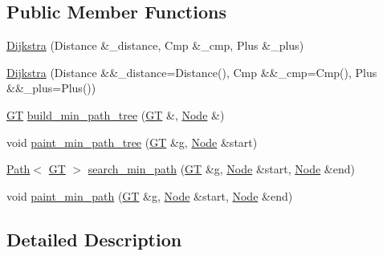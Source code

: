 \subsection*{Public Member Functions}
\begin{DoxyCompactItemize}
\item 
\hyperlink{class_designar_1_1_dijkstra_ada4a9a8403304341114425e296c5ed26}{Dijkstra} (Distance \&\+\_\+distance, Cmp \&\+\_\+cmp, Plus \&\+\_\+plus)
\item 
\hyperlink{class_designar_1_1_dijkstra_a26f374b129c8108d6b95fc57f8dc09df}{Dijkstra} (Distance \&\&\+\_\+distance=Distance(), Cmp \&\&\+\_\+cmp=Cmp(), Plus \&\&\+\_\+plus=Plus())
\item 
\hyperlink{demo-buildgraph_8_c_a3001c40d2c31ca87ed96cd7d1334a55e}{GT} \hyperlink{class_designar_1_1_dijkstra_a70bbeb5dcd70c6ff3d203b7772021467}{build\+\_\+min\+\_\+path\+\_\+tree} (\hyperlink{demo-buildgraph_8_c_a3001c40d2c31ca87ed96cd7d1334a55e}{GT} \&, \hyperlink{class_designar_1_1_dijkstra_afeb644fc5395569ec366f0d220ab477d}{Node} \&)
\item 
void \hyperlink{class_designar_1_1_dijkstra_a607872c03f2e6de59936118e6f6c8790}{paint\+\_\+min\+\_\+path\+\_\+tree} (\hyperlink{demo-buildgraph_8_c_a3001c40d2c31ca87ed96cd7d1334a55e}{GT} \&g, \hyperlink{class_designar_1_1_dijkstra_afeb644fc5395569ec366f0d220ab477d}{Node} \&start)
\item 
\hyperlink{class_designar_1_1_path}{Path}$<$ \hyperlink{demo-buildgraph_8_c_a3001c40d2c31ca87ed96cd7d1334a55e}{GT} $>$ \hyperlink{class_designar_1_1_dijkstra_ab2d75c571dff03279bea0192047461f0}{search\+\_\+min\+\_\+path} (\hyperlink{demo-buildgraph_8_c_a3001c40d2c31ca87ed96cd7d1334a55e}{GT} \&g, \hyperlink{class_designar_1_1_dijkstra_afeb644fc5395569ec366f0d220ab477d}{Node} \&start, \hyperlink{class_designar_1_1_dijkstra_afeb644fc5395569ec366f0d220ab477d}{Node} \&end)
\item 
void \hyperlink{class_designar_1_1_dijkstra_a103839d3bd4e6d8733d2b47b186e137a}{paint\+\_\+min\+\_\+path} (\hyperlink{demo-buildgraph_8_c_a3001c40d2c31ca87ed96cd7d1334a55e}{GT} \&g, \hyperlink{class_designar_1_1_dijkstra_afeb644fc5395569ec366f0d220ab477d}{Node} \&start, \hyperlink{class_designar_1_1_dijkstra_afeb644fc5395569ec366f0d220ab477d}{Node} \&end)
\end{DoxyCompactItemize}


\subsection{Detailed Description}
